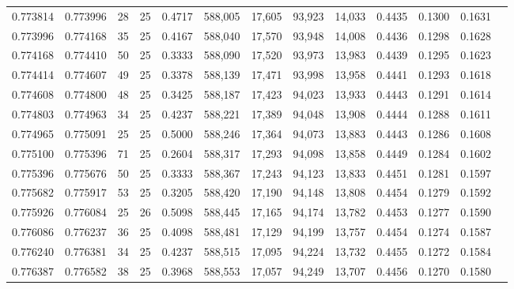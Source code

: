 \begin{tabular}{rrrrrrrrrrrrr}
0.773814 & 0.773996 &    28 &  25 &                                     0.4717 & 588,005 &  17,605 &  93,923 &  14,033 & 0.4435 & 0.1300 & 0.1631 \\
0.773996 & 0.774168 &    35 &  25 &                                     0.4167 & 588,040 &  17,570 &  93,948 &  14,008 & 0.4436 & 0.1298 & 0.1628 \\
0.774168 & 0.774410 &    50 &  25 &                                     0.3333 & 588,090 &  17,520 &  93,973 &  13,983 & 0.4439 & 0.1295 & 0.1623 \\
0.774414 & 0.774607 &    49 &  25 &                                     0.3378 & 588,139 &  17,471 &  93,998 &  13,958 & 0.4441 & 0.1293 & 0.1618 \\
0.774608 & 0.774800 &    48 &  25 &                                     0.3425 & 588,187 &  17,423 &  94,023 &  13,933 & 0.4443 & 0.1291 & 0.1614 \\
0.774803 & 0.774963 &    34 &  25 &                                     0.4237 & 588,221 &  17,389 &  94,048 &  13,908 & 0.4444 & 0.1288 & 0.1611 \\
0.774965 & 0.775091 &    25 &  25 &                                     0.5000 & 588,246 &  17,364 &  94,073 &  13,883 & 0.4443 & 0.1286 & 0.1608 \\
0.775100 & 0.775396 &    71 &  25 &                                     0.2604 & 588,317 &  17,293 &  94,098 &  13,858 & 0.4449 & 0.1284 & 0.1602 \\
0.775396 & 0.775676 &    50 &  25 &                                     0.3333 & 588,367 &  17,243 &  94,123 &  13,833 & 0.4451 & 0.1281 & 0.1597 \\
0.775682 & 0.775917 &    53 &  25 &                                     0.3205 & 588,420 &  17,190 &  94,148 &  13,808 & 0.4454 & 0.1279 & 0.1592 \\
0.775926 & 0.776084 &    25 &  26 &                                     0.5098 & 588,445 &  17,165 &  94,174 &  13,782 & 0.4453 & 0.1277 & 0.1590 \\
0.776086 & 0.776237 &    36 &  25 &                                     0.4098 & 588,481 &  17,129 &  94,199 &  13,757 & 0.4454 & 0.1274 & 0.1587 \\
0.776240 & 0.776381 &    34 &  25 &                                     0.4237 & 588,515 &  17,095 &  94,224 &  13,732 & 0.4455 & 0.1272 & 0.1584 \\
0.776387 & 0.776582 &    38 &  25 &                                     0.3968 & 588,553 &  17,057 &  94,249 &  13,707 & 0.4456 & 0.1270 & 0.1580 \\

\end{tabular}
